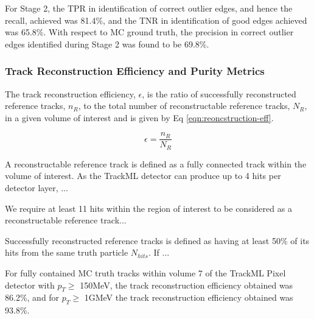 For Stage 2, the TPR in identification of correct outlier edges, and hence the recall, achieved was 81.4\%, and the TNR in identification of good edges achieved was 65.8\%. With respect to MC ground truth, the precision in correct outlier edges identified during Stage 2 was found to be 69.8\%.








\subsubsection{Track Reconstruction Efficiency and Purity Metrics}

The track reconstruction efficiency, $\epsilon$, is the ratio of successfully reconstructed reference tracks, $n_R$, to the total number of reconstructable reference tracks, $N_R$, in a given volume of interest and is given by Eq \eqref{eqn:reoncstruction-eff}. 


\begin{equation}
    \epsilon = \frac{n_R}{N_R}
    \label{eqn:reoncstruction-eff}
\end{equation}

A reconstructable reference track is defined as a fully connected track within the volume of interest. As the TrackML detector can produce up to 4 hits per detector layer, ...


We require at least 11 hits within the region of interest to be considered as a reconstructable reference track...

Successfully reconstructed reference tracks is defined as having at least 50\% of its hits from the same truth particle $N_{hits}$. If ...

For fully contained MC truth tracks within volume 7 of the TrackML Pixel detector with $p_{T} \geq$ 150MeV, the track reconstruction efficiency obtained was 86.2\%, and for $p_{T} \geq$ 1GMeV the track reconstruction efficiency obtained was 93.8\%.





